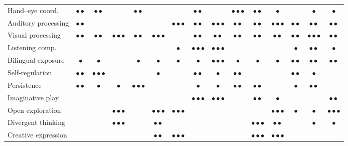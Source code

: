 \documentclass[12pt, a4paper]{article}
\begin{document}
\begin{table}[htbp]
\begin{tabular}{lcccccccccccccc}
Hand--eye coord.     & $\bullet\bullet$ & $\bullet\bullet$ & & $\bullet\bullet$ & & & $\bullet\bullet$ & & $\bullet\bullet\bullet$ & $\bullet\bullet$ & $\bullet$ & & $\bullet$ & $\bullet$ \\
Auditory processing  & $\bullet\bullet$ & & & & & $\bullet\bullet\bullet$ & $\bullet\bullet$ & $\bullet\bullet\bullet$ & $\bullet\bullet$ & $\bullet\bullet$ & $\bullet\bullet\bullet$ & $\bullet\bullet$ & $\bullet\bullet$ & $\bullet\bullet$ \\
Visual processing    & $\bullet\bullet$ & $\bullet\bullet$ & $\bullet\bullet\bullet$ & $\bullet\bullet$ & $\bullet\bullet\bullet$ & & $\bullet\bullet$ & $\bullet\bullet$ & $\bullet\bullet$ & $\bullet\bullet$ & $\bullet\bullet$ & $\bullet\bullet$ & $\bullet\bullet\bullet$ & $\bullet\bullet$ \\
\midrule
Listening comp.      & & & & & & $\bullet$ & $\bullet\bullet\bullet$ & $\bullet\bullet\bullet$ & & & & $\bullet$ & $\bullet\bullet$ & $\bullet$ \\
Bilingual exposure   & $\bullet$ & $\bullet$ & & $\bullet$ & $\bullet$ & $\bullet$ & $\bullet$ & $\bullet\bullet\bullet$ & $\bullet$ & $\bullet$ & $\bullet$ & $\bullet\bullet$ & $\bullet\bullet$ & $\bullet\bullet$ \\
\midrule
Self-regulation      & $\bullet\bullet$ & $\bullet\bullet\bullet$ & & & $\bullet$ & & $\bullet\bullet$ & $\bullet$ & $\bullet\bullet$ & & & $\bullet\bullet$ & $\bullet$ & \\
Persistence          & $\bullet\bullet$ & $\bullet$ & $\bullet$ & $\bullet\bullet\bullet$ & & & $\bullet$ & $\bullet$ & $\bullet\bullet$ & $\bullet\bullet$ & & $\bullet$ & $\bullet\bullet$ & \\
Imaginative play     & & & & & & & $\bullet\bullet\bullet$ & $\bullet\bullet\bullet$ & & $\bullet\bullet$ & $\bullet$ & & & $\bullet\bullet$ \\
\midrule
Open exploration     & & & $\bullet\bullet\bullet$ & & $\bullet\bullet\bullet$ & $\bullet\bullet\bullet$ & & & & & $\bullet\bullet\bullet$ & $\bullet$ & $\bullet$ & $\bullet\bullet\bullet$ \\
Divergent thinking   & & & $\bullet\bullet\bullet$ & & $\bullet\bullet$ & & & & & $\bullet\bullet\bullet$ & $\bullet\bullet$ & & $\bullet$ & $\bullet$ \\
Creative expression  & & & & & $\bullet\bullet$ & $\bullet\bullet\bullet$ & & & & $\bullet\bullet\bullet$ & $\bullet\bullet\bullet$ & & & \\
\bottomrule
\end{tabular}
\end{table}
\end{document}
